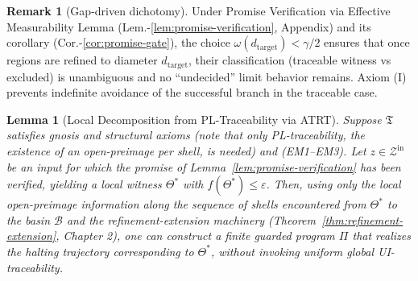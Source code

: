 \documentclass[12pt]{article}
\theoremstyle{definition}
\newtheorem{remark}{Remark}[section]
\theoremstyle{plain}
\newtheorem{lemma}{Lemma}[section]
\begin{document}
\begin{remark}[Gap-driven dichotomy]
Under Promise Verification via Effective Measurability Lemma (Lem.-\ref{lem:promise-verification}, Appendix) and its corollary (Cor.-\ref{cor:promise-gate}), the choice \(\omega(d_{\mathrm{target}})<\gamma/2\) ensures that once regions are refined to diameter \(d_{\mathrm{target}}\), their classification (traceable witness vs excluded) is unambiguous and no “undecided” limit behavior remains. Axiom (I) prevents indefinite avoidance of the successful branch in the traceable case.
\end{remark}

\begin{lemma}[Local Decomposition from PL-Traceability via ATRT]
\label{lem:local-decomposition-pl}
Suppose \(\mathfrak T\) satisfies gnosis and structural axioms (note that only PL-traceability, the existence of an open-preimage per shell, is needed) and (EM1--EM3). Let \(z\in\mathcal Z^{\mathrm{in}}\) be an input for which the promise of Lemma~\ref{lem:promise-verification} has been verified, yielding a local witness \(\Theta^*\) with \(f(\Theta^*)\le \varepsilon\). Then, using only the local open-preimage information along the sequence of shells encountered from \(\Theta^*\) to the basin \(\mathcal B\) and the refinement-extension machinery (Theorem~\ref{thm:refinement-extension}, Chapter 2), one can construct a finite guarded program \(\Pi\) that realizes the halting trajectory corresponding to \(\Theta^*\), without invoking uniform global UI-traceability.
\end{lemma}
\end{document}
